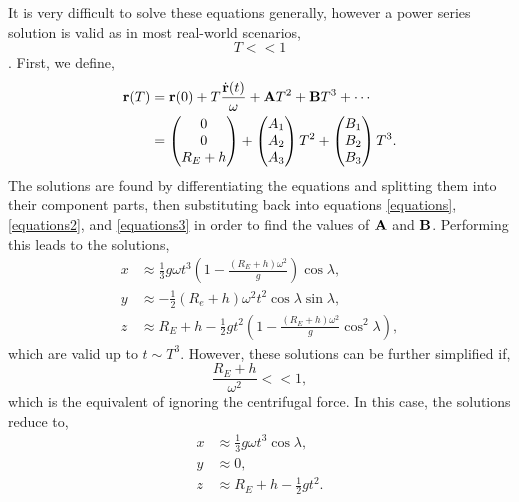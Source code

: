 \documentclass{book}
\begin{document}
It is very difficult to solve these equations generally, however a power series solution is valid as in most real-world scenarios, $$T << 1$$. First, we define,
\begin{equation}
\begin{split}
    \vb{r}(T) & = \vb{r}(0) + T\frac{\Dot{\vb{r}}(t)}{\omega} + \vb{A}T^2 + \vb{B}T^3 + \cdots \\
    & = \begin{pmatrix}
        0 \\ 0 \\ R_E + h
    \end{pmatrix} + \begin{pmatrix}
        A_1 \\ A_2 \\ A_3 
    \end{pmatrix}T^2 + \begin{pmatrix}
        B_1 \\ B_2 \\ B_3
    \end{pmatrix}T^3.
\end{split}
\end{equation}
The solutions are found by differentiating the equations and splitting them into their component parts, then substituting back into equations \eqref{equations}, \eqref{equations2}, and \eqref{equations3} in order to find the values of $\vb{A}$ and $\vb{B}$. Performing this leads to the solutions,
\begin{align}
    x & \approx \frac{1}{3}g\omega t^3\left(1 - \frac{(R_E + h)\omega^2}{g}\right)\cos\lambda, \\
    y & \approx -\frac{1}{2}(R_e+h)\omega^2t^2\cos\lambda \sin\lambda, \\
    z & \approx R_E + h -\frac{1}{2}gt^2\left(1 - \frac{(R_E + h)\omega^2}{g}\cos^2\lambda\right),
\end{align}
which are valid up to $t \sim T^3$. However, these solutions can be further simplified if,
\begin{equation}
    \frac{R_E + h}{\omega^2} << 1,
\end{equation}
which is the equivalent of ignoring the centrifugal force. In this case, the solutions reduce to,
\begin{align}
    x & \approx \frac{1}{3}g\omega t^3 \cos\lambda, \\
    y & \approx 0, \\
    z & \approx R_E + h - \frac{1}{2}gt^2.
\end{align}
\end{document}
